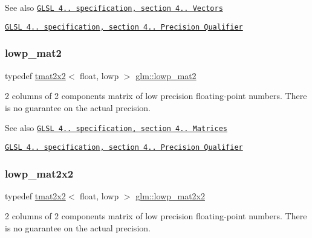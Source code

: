 \begin{DoxySeeAlso}{See also}
\href{http://www.opengl.org/registry/doc/GLSLangSpec.4.20.8.pdf}{\tt G\+L\+SL 4.. specification, section 4.. Vectors} 

\href{http://www.opengl.org/registry/doc/GLSLangSpec.4.20.8.pdf}{\tt G\+L\+SL 4.. specification, section 4.. Precision Qualifier} 
\end{DoxySeeAlso}
\mbox{\label{group__core__precision_ga2eb6d28afe554e1a2ebc79e3201e8651}} 
\subsubsection{\texorpdfstring{lowp\+\_\+mat2}{lowp\_mat2}}
{\footnotesize\ttfamily typedef \hyperlink{structglm_1_1tmat2x2}{tmat2x2}$<$ float, lowp $>$ \hyperlink{group__core__precision_ga2eb6d28afe554e1a2ebc79e3201e8651}{glm\+::lowp\+\_\+mat2}}

2 columns of 2 components matrix of low precision floating-\/point numbers. There is no guarantee on the actual precision.

\begin{DoxySeeAlso}{See also}
\href{http://www.opengl.org/registry/doc/GLSLangSpec.4.20.8.pdf}{\tt G\+L\+SL 4.. specification, section 4.. Matrices} 

\href{http://www.opengl.org/registry/doc/GLSLangSpec.4.20.8.pdf}{\tt G\+L\+SL 4.. specification, section 4.. Precision Qualifier} 
\end{DoxySeeAlso}
\mbox{\label{group__core__precision_ga764ca10ac431c7306adaf9e134795919}} 
\subsubsection{\texorpdfstring{lowp\+\_\+mat2x2}{lowp\_mat2x2}}
{\footnotesize\ttfamily typedef \hyperlink{structglm_1_1tmat2x2}{tmat2x2}$<$ float, lowp $>$ \hyperlink{group__core__precision_ga764ca10ac431c7306adaf9e134795919}{glm\+::lowp\+\_\+mat2x2}}

2 columns of 2 components matrix of low precision floating-\/point numbers. There is no guarantee on the actual precision.


